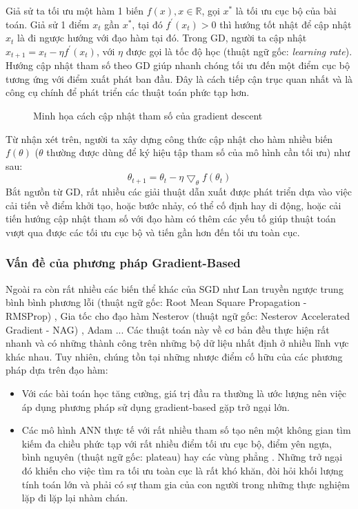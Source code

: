     Giả sử ta tối ưu một hàm 1 biến $f(x), x\in \mathbb{R}$, gọi $x^*$ là tối ưu cục bộ của bài toán. Giả sử 1 điểm $x_t$ gần $x^*$, tại đó $f^'(x_t) > 0$ thì hướng tốt nhật để cập nhật $x_t$ là đi ngược hướng với đạo hàm tại đó. Trong GD, người ta cập nhật $x_{t+1}=x_t - \eta f^'(x_t)$, với $\eta$ được gọi là tốc độ học (thuật ngữ gốc: \emph{learning rate}). Hướng cập nhật tham số theo GD giúp nhanh chóng tối ưu đến một điểm cục bộ tương ứng với điểm xuất phát ban đầu. Đây là cách tiếp cận trục quan nhất và là công cụ chính để phát triển các thuật toán phức tạp hơn.
    \begin{figure}[ht]
        \centering
        \caption{Minh họa cách cập nhật tham số của gradient descent}
        \label{fig:gd}
    \end{figure}
    Từ nhận xét trên, người ta xây dựng công thức cập nhật cho hàm nhiều biến $f(\theta)$ ($\theta$ thường được dùng để ký hiệu tập tham số của mô hình cần tối ưu) như sau:
    \begin{equation}
        \theta_{t+1} = \theta_t - \eta \bigtriangledown_\theta f(\theta_t)
    \end{equation}
    Bắt ngưồn từ GD, rất nhiều các giải thuật dẫn xuất được phát triển dựa vào việc cải tiến về điểm khởi tạo, hoặc
    bước nhảy, có thể cố định hay di động, hoặc cải tiến hướng cập nhật tham số với đạo hàm có thêm các yếu tố giúp thuật toán vượt qua được các tối ưu cục bộ và tiến gần hơn đến tối ưu toàn cục. 
    \subsubsection{Vấn đề của phương pháp Gradient-Based}
    Ngoài ra còn rất nhiều các biến thể khác của SGD như Lan truyền ngược trung bình bình phương lỗi (thuật ngữ gốc: Root Mean Square Propagation - RMSProp) \cite{tieleman2012lecture}, Gia tốc cho đạo hàm Nesterov (thuật ngữ gốc: Nesterov Accelerated Gradient - NAG) \cite{nesterov2013gradient}, Adam \cite{kingma2014adam}... Các thuật toán này về cơ bản đều thực hiện rất nhanh và có những thành công trên những bộ dữ liệu nhất định ở nhiều lĩnh vực khác nhau. Tuy nhiên, chúng tồn tại những nhược
    điểm cố hữu của các phương pháp dựa trên đạo hàm:
    \begin{itemize}
        \item Với các bài toán học tăng cường, giá trị đầu ra thường là ước lượng nên việc áp dụng phương pháp sử dụng gradient-based gặp trở ngại lớn.
        \item Các mô hình ANN thực tế với rất nhiều tham số tạo nên một không gian tìm kiếm đa chiều phức tạp với rất nhiều điểm tối ưu cục bộ, điểm yên ngựa, bình nguyên (thuật ngữ gốc: plateau) hay các vùng phẳng \cite{eldan2016power, kawaguchi2016deep, miikkulainen2019evolving}. Những trở ngại đó khiến cho việc tìm ra tối ưu toàn cục là rất khó khăn, đòi hỏi khối lượng tính toán lớn và phải có sự tham gia của con người trong những thực nghiệm lặp đi lặp lại nhàm chán.
    \end{itemize}
    

